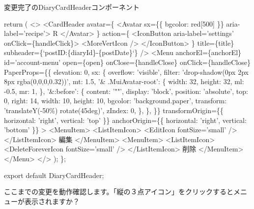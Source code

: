 \begin{starterprogram}[]{変更完了のDiaryCardHeaderコンポーネント}
{    return (
      \textless{}\textgreater{}
        \textless{}CardHeader
          avatar=\{
            \textless{}Avatar sx=\{\{ bgcolor: red[500] \}\} aria{-}label='recipe'\textgreater{}
              R
            \textless{}/Avatar\textgreater{}
          \}
          action=\{
            \textless{}IconButton aria{-}label='settings' onClick=\{handleClick\}\textgreater{}
              \textless{}MoreVertIcon /\textgreater{}
            \textless{}/IconButton\textgreater{}
          \}
          title=\{title\}
          subheader=\{`postID:\textdollar{}\{diaryId\}{-}\textdollar{}\{postDate\}`\}
        /\textgreater{}
        \textless{}Menu
          anchorEl=\{anchorEl\}
          id='account{-}menu'
          open=\{open\}
          onClose=\{handleClose\}
          onClick=\{handleClose\}
          PaperProps=\{\{
            elevation: 0,
            sx: \{
              overflow: 'visible',
              filter: 'drop{-}shadow(0px 2px 8px rgba(0,0,0,0.32))',
              mt: 1.5,
              '\& .MuiAvatar{-}root': \{
                width: 32,
                height: 32,
                ml: {-}0.5,
                mr: 1,
              \},
              '\&:before': \{
                content: '""',
                display: 'block',
                position: 'absolute',
                top: 0,
                right: 14,
                width: 10,
                height: 10,
                bgcolor: 'background.paper',
                transform: 'translateY({-}50\%) rotate(45deg)',
                zIndex: 0,
              \},
            \},
          \}\}
          transformOrigin=\{\{ horizontal: 'right', vertical: 'top' \}\}
          anchorOrigin=\{\{ horizontal: 'right', vertical: 'bottom' \}\}
        \textgreater{}
          \textless{}MenuItem\textgreater{}
            \textless{}ListItemIcon\textgreater{}
              \textless{}EditIcon fontSize='small' /\textgreater{}
            \textless{}/ListItemIcon\textgreater{}
            編集
          \textless{}/MenuItem\textgreater{}
          \textless{}MenuItem\textgreater{}
            \textless{}ListItemIcon\textgreater{}
              \textless{}DeleteForeverIcon fontSize='small' /\textgreater{}
            \textless{}/ListItemIcon\textgreater{}
            削除
          \textless{}/MenuItem\textgreater{}
        \textless{}/Menu\textgreater{}
      \textless{}/\textgreater{}
    );
  \};

  export default DiaryCardHeader;}\end{starterprogram}

ここまでの変更を動作確認します。「縦の３点アイコン」をクリックするとメニューが表示されますか？


